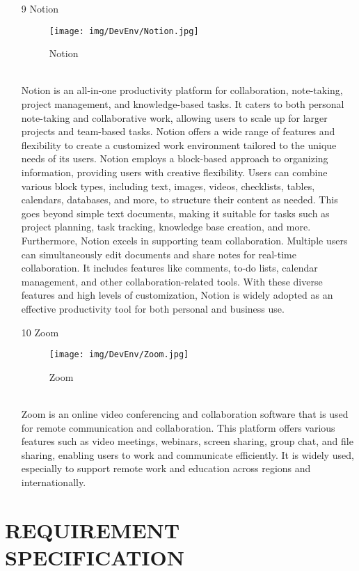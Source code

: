 \documentclass[conference]{IEEEtran}
\begin{document}
\begin{enumerate}
\item[9] Notion
\begin{figure}[h]
\centering
\texttt{[image: img/DevEnv/Notion.jpg]}
\caption{Notion} 
\end{figure}\\
Notion is an all-in-one productivity platform for collaboration, note-taking, project management, and knowledge-based tasks. It caters to both personal note-taking and collaborative work, allowing users to scale up for larger projects and team-based tasks. Notion offers a wide range of features and flexibility to create a customized work environment tailored to the unique needs of its users.
Notion employs a block-based approach to organizing information, providing users with creative flexibility. Users can combine various block types, including text, images, videos, checklists, tables, calendars, databases, and more, to structure their content as needed. This goes beyond simple text documents, making it suitable for tasks such as project planning, task tracking, knowledge base creation, and more.
Furthermore, Notion excels in supporting team collaboration. Multiple users can simultaneously edit documents and share notes for real-time collaboration. It includes features like comments, to-do lists, calendar management, and other collaboration-related tools. With these diverse features and high levels of customization, Notion is widely adopted as an effective productivity tool for both personal and business use.\\

\item[10] Zoom
\begin{figure}[h]
\centering
\texttt{[image: img/DevEnv/Zoom.jpg]}
\caption{Zoom} 
\end{figure}\\
Zoom is an online video conferencing and collaboration software that is used for remote communication and collaboration. This platform offers various features such as video meetings, webinars, screen sharing, group chat, and file sharing, enabling users to work and communicate efficiently. It is widely used, especially to support remote work and education across regions and internationally.\\
\end{enumerate}





\section{REQUIREMENT SPECIFICATION}
\end{document}

